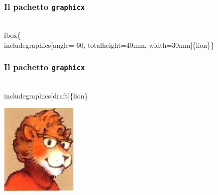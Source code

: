 \documentclass[svgnames,%
	ucs,%
	pdftex]{guitbeamer}
\begin{document}
\begin{frame}
  \frametitle{Il pachetto \texttt{graphicx}}
	\begin{LaTeXcode}
		\alert{\\fbox\{}\\includegraphics[angle=-60, totalheight=40mm, width=30mm]\{lion\}\alert{\}}
	\end{LaTeXcode}
	\begin{center}
	\end{center}
\end{frame}
\begin{frame}
  \frametitle{Il pachetto \texttt{graphicx}}
	\begin{LaTeXcode}
		\\includegraphics\alert{[draft]}\{lion\}
	\end{LaTeXcode}
	\begin{center}
		\includegraphics[draft]{lion}
	\end{center}
\end{frame}
\end{document}
